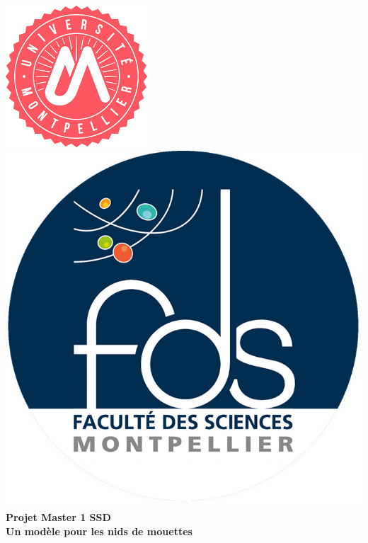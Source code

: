 \documentclass[frenchb]{report}
\newcommand{\1}{\mathbbm{1}}
\theoremstyle{definition}\newtheorem{defn}{Définition}
\theoremstyle{definition}\newtheorem{exm}{Exemple}
\theoremstyle{definition}\newtheorem{nota}{Notation}
\theoremstyle{definition}\newtheorem{rem}{Remarque}
\begin{document}
\def\appendixpage{\vspace*{8cm}
\begin{center}
\Huge\textbf{Annexes}
\end{center}
}
\def\appendixname{Annexe}%

\begin{titlepage}
\begin{center}
\includegraphics[scale=0.6]{logo.png}
\hfill
\includegraphics[scale=0.35]{fds_logo.png}\\[3cm]
\linespread{1.2}\huge {\bfseries Projet Master 1 SSD }\\[0.5cm]
\linespread{1.2}\LARGE {\bfseries Un modèle pour les nids de mouettes}\\[1.5cm]
\linespread{1}


\end{center}
\end{titlepage}
\end{document}
